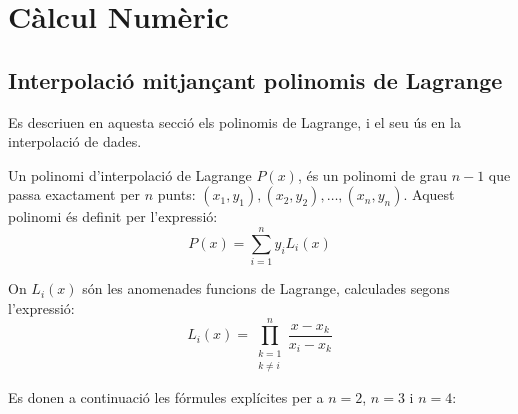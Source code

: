 \chapter{Càlcul Numèric} 

\section{Interpolació mitjançant polinomis de Lagrange}
\label{sec:poli_lagr}

Es descriuen en aquesta secció els polinomis de Lagrange, i el seu ús en la interpolació de dades.

Un polinomi d'interpolació de Lagrange $P(x)$, és un polinomi de grau $n-1$ que passa exactament per $n$ punts:
$(x_1, y_1), (x_2, y_2), \dots, (x_n, y_n)$. Aquest polinomi és definit per l'expressió:
\begin{equation}
  P(x) = \sum_{i=1}^{n}  y_i L_i(x) \label{eq:poly_lag_1}
\end{equation}

On $L_i(x)$ són les anomenades funcions de Lagrange, calculades segons l'expressió:
\begin{equation}
  L_i(x) = \prod_{\substack{k=1 \\ k\neq i}}^{n} \frac{x-x_k}{x_i-x_k} \label{eq:poly_lag_2}
\end{equation}

Es donen a continuació les fórmules explícites per a $n = 2$, $n=3$ i $n=4$:

